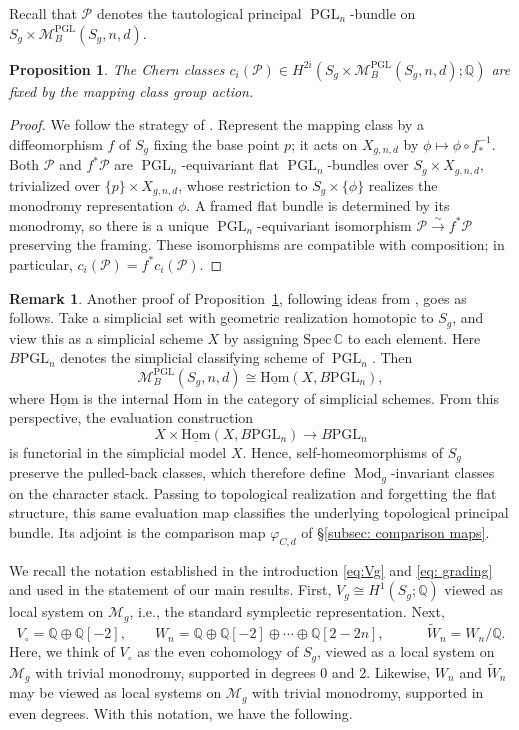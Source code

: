 \documentclass[11pt,reqno]{amsart}
\theoremstyle{plain} %
\newtheorem{prop}[theorem]{Proposition}
\theoremstyle{definition}
\newtheorem{remark}[theorem]{Remark}
\newcommand{\QQ}{\mathbb{Q}}
\newcommand{\CC}{\mathbb{C}}
\newcommand{\Hom}{\mathrm{Hom}}
\newcommand{\M}{\mathcal{M}}
\newcommand{\mc}{\mathcal}
\DeclareMathOperator{\PGL}{PGL}
\newcommand{\BPGL}{B\mathrm{PGL}}
\DeclareMathOperator{\Mod}{Mod}
\newcommand{\tW}{\widetilde{W}}
\begin{document}
Recall that $\mc P$ denotes the tautological principal $\PGL_n$-bundle on $S_g \times \M_B^{\PGL}(S_g,n,d)$.

\begin{prop} \label{prop: identifying monodromy}
The Chern classes $c_i(\mc P) \in H^{2i}(S_g \times \M_B^{\PGL}(S_g,n,d); \QQ)$ are fixed by the mapping class group action.
\end{prop}

\begin{proof}
    We follow the strategy of \cite[(5.1)]{hausel-thaddeus-generation-pgl2}. Represent the mapping class by a diffeomorphism $f$ of $S_g$ fixing the base point $p$; it acts on $X_{g,n,d}$ by $\phi \mapsto \phi \circ f_*^{-1}$. Both $\mc P$ and $f^* \mc P$ are $\PGL_n$-equivariant flat $\PGL_n$-bundles over $S_g \times X_{g,n,d}$, trivialized over $\{p\} \times X_{g,n,d}$, whose restriction to $S_g \times \{\phi\}$ realizes the monodromy representation $\phi$. A framed flat bundle is determined by its monodromy, so there is a unique $\PGL_n$-equivariant isomorphism $\mc P \xrightarrow{\sim} f^*\mc P$ preserving the framing. These isomorphisms are compatible with composition; in particular, $c_i(\mc P) = f^*c_i(\mc P)$.
\end{proof}

\begin{remark}\label{rmk: simplicial evaluation}
    Another proof of Proposition~\ref{prop: identifying monodromy}, following ideas from \cite{Shende}, goes as follows. Take a simplicial set with geometric realization homotopic to $S_g$, and view this as a simplicial scheme $X$ by assigning $\mathrm{Spec}\, \CC$ to each element. Here $\BPGL_n$ denotes the simplicial classifying scheme of $\PGL_n$. Then
    $$\M_B^{\PGL}(S_g,n,d) \cong \underline{\Hom}(X, \BPGL_n),$$
where $\underline{\Hom}$ is the internal Hom in the category of simplicial schemes. %
    From this perspective, the evaluation construction
    $$X \times {\underline{\Hom}}(X, \BPGL_n) \to \BPGL_n$$
    is functorial in the simplicial model $X$. Hence, self-homeomorphisms of $S_g$ preserve the pulled-back classes, which therefore define $\Mod_g$-invariant classes on the character stack. Passing to topological realization and forgetting the flat structure, this same evaluation map classifies the underlying topological principal bundle. Its adjoint is the comparison map $\varphi_{C,d}$ of \S\ref{subsec: comparison maps}. 
\end{remark}

We recall the notation established in the introduction \eqref{eq:Vg} and \eqref{eq: grading} and used in the statement of our main results. First,    $V_g \cong H^1(S_g;\QQ)$ viewed as local system on $\M_g$, i.e., the standard symplectic representation. Next,
\[
V_\circ = \QQ \oplus \QQ[-2], \quad \quad W_n = \QQ \oplus \QQ[-2] \oplus \cdots \oplus \QQ[2-2n], \quad \quad 
\quad  \widetilde{W}_n = W_n / \QQ. %
\]
Here, we think of $V_\circ$ as the even cohomology of $S_g$, viewed as a local system on $\M_g$ with trivial monodromy, supported in degrees 0 and 2. Likewise, $W_n$ and $\tW_n$ may be viewed as local systems on $\M_g$ with trivial monodromy, supported in even degrees. With this notation, we have the following.
\end{document}
